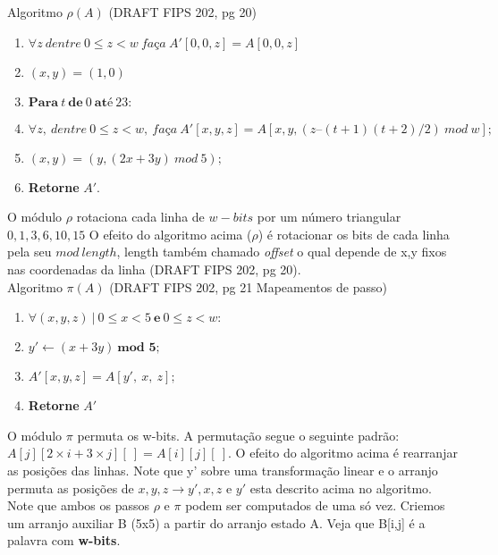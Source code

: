 \documentclass[12pt, a4paper]{article}
\begin{document}
\begin{enumerate}
\begin{enumerate}
Algoritmo $\rho(A)$ (DRAFT FIPS 202, pg 20)
  \begin{enumerate}
    \item $\forall z\ \textit{dentre}\ 0 \le z < w\ \textit{faça}\ A'[0, 0,
    z] = A[0, 0, z]$

    \item $(x, y) = (1, 0)$

    \item $\textbf{Para}\ t\ \textbf{de}\ 0\ \textbf{até}\ 23:$

    \item[] \quad $\forall z,\ \textit{dentre}\ 0 \le z < w,\
    \textit{faça}\ A'[x, y, z] = A[x, y, (z – (t + 1)(t + 2)/2)\ \textit{mod}\
    w];$

    \item[] \quad $(x, y) = (y, (2x + 3y)\ \textit{mod}\ 5);$

    \item \textbf{Retorne} $A'$.\\
  \end{enumerate}

O módulo $\rho$ rotaciona cada linha de $w-bits$  por um número triangular
$0,1,3,6,10,15$ O efeito do algoritmo acima ($\rho$) é rotacionar os bits de
cada linha pela seu $\textit{mod}\ length$, length também chamado
\textit{offset} o qual depende de x,y fixos nas coordenadas da linha (DRAFT FIPS
202, pg 20).\\

Algoritmo $\pi(A)$ (DRAFT FIPS 202, pg 21 Mapeamentos de passo)
  \begin{enumerate}
    \item $\forall (x,y,z)\ |\ 0 \le x < 5\ \textbf{e}\ 0 \le z < w:$
    \item[] \quad $y' \leftarrow (x+3y)\ \textbf{mod 5};$
    \item[] \quad $A'[x,y,z]=A[y',\ x,\ z];$
    \item \textbf{Retorne} $A'$\\
  \end{enumerate}

O módulo $\pi$ permuta os w-bits. A permutação segue o seguinte padrão:
$A[j][2\times i+3\times j][~]=A[i][j][~]$. O efeito do algoritmo acima é
rearranjar as posições das linhas. Note que y' sobre uma transformação linear e
o arranjo permuta as posições de $x,y,z \rightarrow y',x,z$ e $y'$ esta descrito
acima no algoritmo.\\

Note que ambos os passos $\rho$ e $\pi$ podem ser computados de uma só vez.
Criemos um arranjo auxiliar B (5x5) a partir do arranjo estado A. Veja que
B[i,j] é a palavra com \textbf{w-bits}.


\end{enumerate}
\end{enumerate}
\end{document}
